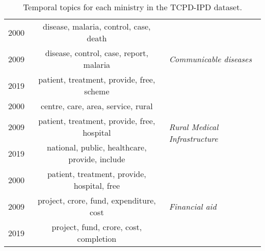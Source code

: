 \documentclass[10pt, a4paper]{article}
\begin{document}
\begin{table}[!htbp]
\begin{adjustbox}{width=1\linewidth}
\begin{tabular}{|c|c|l|}
        2000 & disease, malaria, control, case, death & \multirow{3}{2cm}{\textit{Communicable diseases}} \\ \cline{1-2}

        2009 & disease, control, case, report, malaria & \\ \cline{1-2}

        2019 & patient, treatment, provide, free, scheme & \\ \hline \hline
        
        2000 & centre, care, area, service, rural & \multirow{3}{2cm}{\textit{Rural Medical Infrastructure}} \\ \cline{1-2}

        2009 & patient, treatment, provide, free, hospital & \\ \cline{1-2}

        2019 & national, public, healthcare, provide, include & \\ \hline \hline
        
        2000 & patient, treatment, provide, hospital, free & \multirow{3}{2cm}{\textit{Financial aid}} \\ \cline{1-2}

        2009 & project, crore, fund, expenditure, cost & \\ \cline{1-2}

        2019 & project, fund, crore, cost, completion & \\ \hline %
    \end{tabular}
\end{adjustbox}
\captionsetup{justification=centering}
\caption{
Temporal topics for each ministry in the TCPD-IPD dataset.
\label{Tab:topics_labels}}
\end{table}
\end{document}

